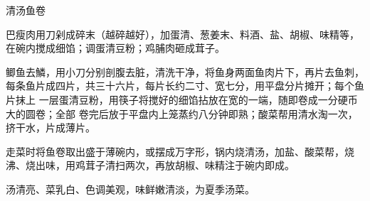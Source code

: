 \begin{recipe}{清汤鱼卷}

\ingredients


\preparation

\step 巴瘦肉用刀剁成碎末（越碎越好），加蛋清、葱姜末、料酒、盐、胡椒、味精等，
在碗内搅成细馅；调蛋清豆粉；鸡脯肉砸成茸子。

\step 鲫鱼去鱗，用小刀分别剖腹去脏，清洗干净，将鱼身两面鱼肉片下，再片去鱼刺，
每条鱼片成四片，共三十六片，每片长约二寸、宽七分，用平盘分片摊开；每个鱼片抹上
一层蛋清豆粉，用筷子将搅好的细馅拈放在宽的一端，随即卷成一分硬币大的圆卷；全部
卷完后放于平盘内上笼蒸约八分钟即熟；酸菜帮用清水淘一次，挤干水，片成薄片。

\step 走菜时将鱼卷取出盛于薄碗内，或摆成万字形，锅内烧清汤，加盐、酸菜帮，烧
沸、烧出味，用鸡茸子清扫两次，再放胡椒、味精注于碗内即成。

\features

汤清亮、菜乳白、色调美观，味鲜嫩清淡，为夏季汤菜。

\end{recipe}

